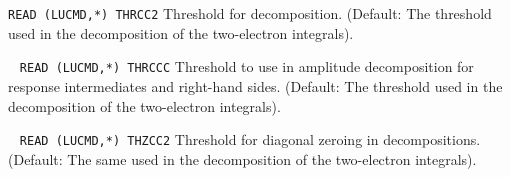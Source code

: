 \begin{description}
\verb|READ (LUCMD,*) THRCC2|\newline
        Threshold for decomposition. (Default: 
        The threshold used in the decomposition of
        the two-electron integrals).
%
\item[\Key{THRCCC}] \verb| |\newline
\verb|READ (LUCMD,*) THRCCC|\newline
        Threshold to use in amplitude decomposition for
        response intermediates and right-hand sides. (Default: 
        The threshold used in the decomposition of
        the two-electron integrals).
%
\item[\Key{ZERO}] \verb| |\newline
\verb|READ (LUCMD,*) THZCC2|\newline
        Threshold for diagonal zeroing in decompositions. (Default: 
        The same used in the decomposition of
        the two-electron integrals).
%
\end{description}
